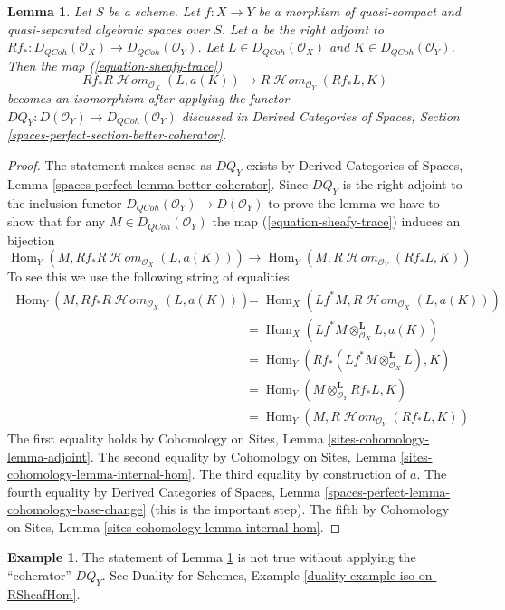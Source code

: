 \documentclass{stacks-project}
\theoremstyle{plain}
\newtheorem{lemma}[subsection]{Lemma}
\theoremstyle{definition}
\newtheorem{example}[subsection]{Example}
\theoremstyle{remark}
\numberwithin{equation}{subsection}
\def\Hom{\mathop{\mathrm{Hom}}\nolimits}
\def\SheafHom{\mathop{\mathcal{H}\!\mathit{om}}\nolimits}
\def\QCoh{\mathit{QCoh}}
\begin{document}
\begin{lemma}
\label{lemma-iso-on-RSheafHom}
Let $S$ be a scheme.
Let $f : X \to Y$ be a morphism of quasi-compact and quasi-separated
algebraic spaces over $S$.
Let $a$ be the right adjoint to
$Rf_* : D_\QCoh(\mathcal{O}_X) \to D_\QCoh(\mathcal{O}_Y)$.
Let $L \in D_\QCoh(\mathcal{O}_X)$ and
$K \in D_\QCoh(\mathcal{O}_Y)$.
Then the map (\ref{equation-sheafy-trace})
$$
Rf_*R\SheafHom_{\mathcal{O}_X}(L, a(K))
\longrightarrow
R\SheafHom_{\mathcal{O}_Y}(Rf_*L, K)
$$
becomes an isomorphism after applying the functor
$DQ_Y : D(\mathcal{O}_Y) \to D_\QCoh(\mathcal{O}_Y)$
discussed in Derived Categories of Spaces, Section
\ref{spaces-perfect-section-better-coherator}.
\end{lemma}

\begin{proof}
The statement makes sense as $DQ_Y$ exists by
Derived Categories of Spaces, Lemma
\ref{spaces-perfect-lemma-better-coherator}.
Since $DQ_Y$ is the right adjoint to the inclusion
functor $D_\QCoh(\mathcal{O}_Y) \to D(\mathcal{O}_Y)$
to prove the lemma we have to show that for any
$M \in D_\QCoh(\mathcal{O}_Y)$
the map (\ref{equation-sheafy-trace}) induces an bijection
$$
\Hom_Y(M, Rf_*R\SheafHom_{\mathcal{O}_X}(L, a(K)))
\longrightarrow
\Hom_Y(M, R\SheafHom_{\mathcal{O}_Y}(Rf_*L, K))
$$
To see this we use the following string of equalities
\begin{align*}
\Hom_Y(M, Rf_*R\SheafHom_{\mathcal{O}_X}(L, a(K)))
& =
\Hom_X(Lf^*M, R\SheafHom_{\mathcal{O}_X}(L, a(K))) \\
& =
\Hom_X(Lf^*M \otimes_{\mathcal{O}_X}^\mathbf{L} L, a(K)) \\
& =
\Hom_Y(Rf_*(Lf^*M \otimes_{\mathcal{O}_X}^\mathbf{L} L), K) \\
& =
\Hom_Y(M \otimes_{\mathcal{O}_Y}^\mathbf{L} Rf_*L, K) \\
& =
\Hom_Y(M, R\SheafHom_{\mathcal{O}_Y}(Rf_*L, K))
\end{align*}
The first equality holds by Cohomology on Sites, Lemma
\ref{sites-cohomology-lemma-adjoint}.
The second equality by Cohomology on Sites, Lemma
\ref{sites-cohomology-lemma-internal-hom}.
The third equality by construction of $a$.
The fourth equality by Derived Categories of Spaces, Lemma
\ref{spaces-perfect-lemma-cohomology-base-change} (this is the important step).
The fifth by Cohomology on Sites, Lemma
\ref{sites-cohomology-lemma-internal-hom}.
\end{proof}

\begin{example}
\label{example-iso-on-RSheafHom}
The statement of Lemma \ref{lemma-iso-on-RSheafHom} is not true without
applying the ``coherator'' $DQ_Y$. See
Duality for Schemes, Example \ref{duality-example-iso-on-RSheafHom}.
\end{example}
\end{document}
